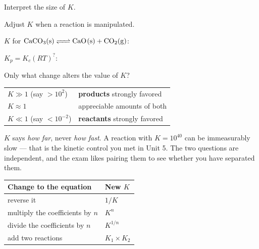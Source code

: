 \documentclass{apchem-notes}
\begin{document}
\begin{objectives}
  \item Interpret the size of $K$.
  \item Adjust $K$ when a reaction is manipulated.
\end{objectives}


\begin{warmup}[3]
  \item $K$ for $\ce{CaCO3(s) <=> CaO(s) + CO2(g)}$:
        \answerblank[2.6cm]{$[\ce{CO2}]$}
  \item $K_p = K_c(RT)^{?}$: 
  \item Only what change alters the value of $K$?
\end{warmup}



\begin{center}
\begin{tabular}{@{}ll@{}}
\hline
$K \gg 1$ (say $> 10^2$) & \textbf{products} strongly favored \\
$K \approx 1$ & appreciable amounts of both \\
$K \ll 1$ (say $< 10^{-2}$) & \textbf{reactants} strongly favored \\
\hline
\end{tabular}
\end{center}

\begin{apctrap}
$K$ says \emph{how far}, never \emph{how fast}. A reaction with
$K = 10^{40}$ can be immeasurably slow --- that is the kinetic control you
met in Unit 5. The two questions are independent, and the exam likes pairing
them to see whether you have separated them.
\end{apctrap}



\begin{center}
\begin{tabular}{@{}ll@{}}
\hline
\textbf{Change to the equation} & \textbf{New $K$} \\
\hline
reverse it & $1/K$ \\
multiply the coefficients by $n$ & $K^n$ \\
divide the coefficients by $n$ & $K^{1/n}$ \\
add two reactions & $K_1 \times K_2$ \\
\hline
\end{tabular}
\end{center}
\end{document}
